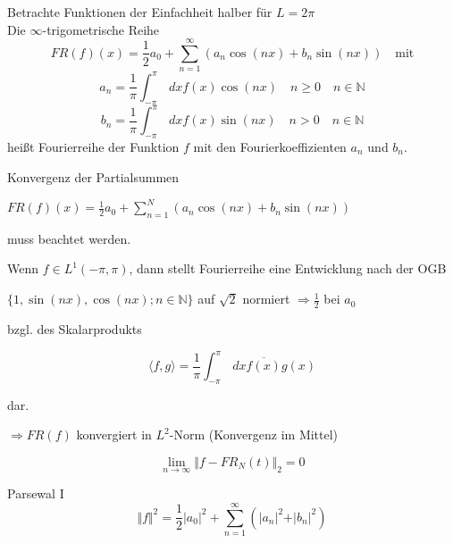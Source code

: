 Betrachte Funktionen der Einfachheit halber für $L=2\pi$\\
Die $\infty$-trigometrische Reihe
$$FR(f)(x)= \frac{1}{2} a_0 + \sum_{n=1}^\infty (a_n \cos(n x) + b_n \sin(n x)) \quad \textrm{mit}$$
$$a_n = \frac{1}{\pi} \int_{-\pi}^{\pi} \,dx f(x)\cos(nx) \quad n \geq 0 \quad n \in \mathbb{N}$$
$$b_n = \frac{1}{\pi} \int_{-\pi}^{\pi} \,dx f(x)\sin(nx) \quad n>0 \quad n \in \mathbb{N}$$
heißt Fourierreihe der Funktion $f$ mit den Fourierkoeffizienten $a_n$ und $b_n$.

Konvergenz der Partialsummen

$FR(f)(x)= \frac{1}{2} a_0 + \sum_{n=1}^N (a_n \cos(n x) + b_n \sin(n x))$

muss beachtet werden.

\begin{Bem}
	Wenn $f \in L^1(-\pi,\pi)$, dann stellt Fourierreihe eine Entwicklung nach der
	OGB

	$\{1, \sin(nx), \cos(nx); n \in \mathbb{N}\}$ auf $\sqrt{2}$ normiert $\Rightarrow \frac{1}{2}$ bei $a_0$

	bzgl. des Skalarprodukts

	$$\langle f,g \rangle =  \frac{1}{\pi} \int_{-\pi}^{\pi} \,dx \overline{f(x)} g(x)$$

	dar.

	$\Rightarrow FR(f)$ konvergiert in $L^2$-Norm (Konvergenz im Mittel)

	$$\lim_{n\rightarrow \infty} {\Vert f- FR_N(t) \Vert}_2 = 0$$
\end{Bem}

\begin{Satz}{Parsewal I}
	$$\Vert f \Vert^2 = \frac{1}{2} \vert a_0 \vert^2 + \sum_{n=1}^{\infty} \left(\vert a_n \vert^2 + \vert b_n \vert^2\right)$$
\end{Satz}


